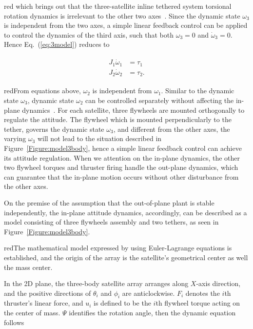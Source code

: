 \begin{color}{red}
which brings out that the three-satellite inline tethered system torsional rotation dynamics is irrelevant to the other two axes~\cite{chung2008propellant1}. Since the dynamic state $\omega_3$ is independent from the two axes, a simple linear feedback control can be applied to control the dynamics of the third axis, such that both $\omega_3=0$ and $\dot\omega_3 = 0$. Hence Eq.~(\ref{eq:3model}) reduces to
\end{color}
\begin{align}
\begin{split}
J_1\dot\omega_1&=\tau_1\\
J_2\dot\omega_2&=\tau_2.
\end{split}
\end{align} \begin{color}{red}From equations above, $\omega_2$ is independent from $\omega_1$. Similar to the dynamic state $\omega_3$, dynamic state $\omega_2$ can be controlled separately without affecting the in-plane dynamics~\cite{chung2007nonlinear,chung2007nonlinear1,chung2007nonlinear3}. For each satellite, three flywheels are mounted orthogonally to regulate the attitude. The flywheel which is mounted perpendicularly to the tether, governs the dynamic state $\omega_3$, and different from the other axes, the varying $\omega_3$ will not lead to the situation described in Figure~\ref{Figure:model3body}, hence a simple linear feedback control can achieve its attitude regulation. When we attention on the in-plane dynamics, the other two flywheel torques and thruster firing handle the out-plane dynamics, which can guarantee that the in-plane motion occurs without other disturbance from the other axes.\end{color} On the premise of the assumption that the out-of-plane plant is stable independently, the in-plane attitude dynamics, accordingly, can be described as a model consisting of three flywheels assembly and two tethers, as seen in Figure~\ref{Figure:model3body}. \begin{color}{red}The mathematical model expressed by using Euler-Lagrange equations is established, and the origin of the array is the satellite's geometrical center as well the mass center.\end{color} In the 2D plane, the three-body satellite array arranges along $X$-axis direction, and the positive directions of $\theta_i$ and $\phi_i$ are anticlockwise. $F_i$ denotes the $i$th thruster's linear force, and $u_i$ is defined to be the $i$th flywheel torque acting on the center of mass. $\Psi$ identifies the rotation angle, then the dynamic equation follows~\cite{chung2007nonlinear1}
